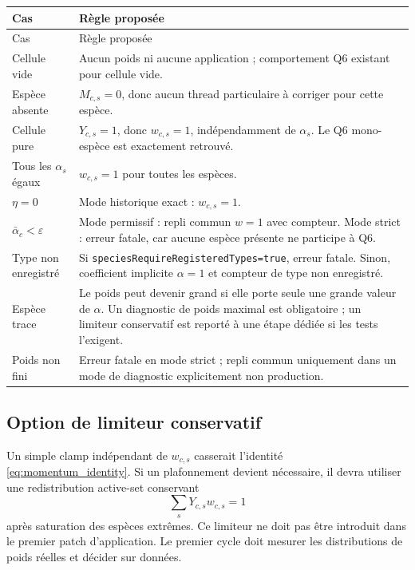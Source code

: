 \documentclass[11pt,a4paper]{article}
\newcommand{\code}[1]{\texttt{#1}}
\begin{document}
\begin{longtable}{@{}p{}p{}@{}}
\toprule
Cas & Règle proposée \\
\midrule
\endfirsthead
\toprule
Cas & Règle proposée \\
\midrule
\endhead
Cellule vide & Aucun poids ni aucune application ; comportement Q6 existant pour cellule vide. \\
Espèce absente & \(M_{c,s}=0\), donc aucun thread particulaire à corriger pour cette espèce. \\
Cellule pure & \(Y_{c,s}=1\), donc \(w_{c,s}=1\), indépendamment de \(\alpha_s\). Le Q6 mono-espèce est exactement retrouvé. \\
Tous les \(\alpha_s\) égaux & \(w_{c,s}=1\) pour toutes les espèces. \\
\(\eta=0\) & Mode historique exact : \(w_{c,s}=1\). \\
\(\bar\alpha_c<\varepsilon\) & Mode permissif : repli commun \(w=1\) avec compteur. Mode strict : erreur fatale, car aucune espèce présente ne participe à Q6. \\
Type non enregistré & Si \code{speciesRequireRegisteredTypes=true}, erreur fatale. Sinon, coefficient implicite \(\alpha=1\) et compteur de type non enregistré. \\
Espèce trace & Le poids peut devenir grand si elle porte seule une grande valeur de \(\alpha\). Un diagnostic de poids maximal est obligatoire ; un limiteur conservatif est reporté à une étape dédiée si les tests l'exigent. \\
Poids non fini & Erreur fatale en mode strict ; repli commun uniquement dans un mode de diagnostic explicitement non production. \\
\bottomrule
\end{longtable}

\subsection{Option de limiteur conservatif}

Un simple clamp indépendant de \(w_{c,s}\) casserait l'identité \eqref{eq:momentum_identity}. Si un plafonnement devient nécessaire, il devra utiliser une redistribution active-set conservant
\begin{equation}
  \sum_sY_{c,s}w_{c,s}=1
\end{equation}
après saturation des espèces extrêmes. Ce limiteur ne doit pas être introduit dans le premier patch d'application. Le premier cycle doit mesurer les distributions de poids réelles et décider sur données.
\end{document}
